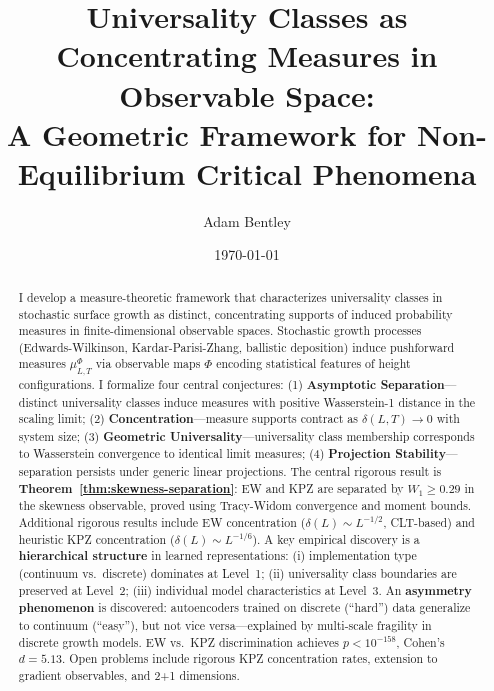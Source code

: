 \documentclass[aps,pre,reprint,amsmath,amssymb,superscriptaddress]{revtex4-2}
\begin{document}

\title{Universality Classes as Concentrating Measures in Observable Space:\\ A Geometric Framework for Non-Equilibrium Critical Phenomena}

\author{Adam Bentley}

\date{\today}

\begin{abstract}
I develop a measure-theoretic framework that characterizes universality classes in stochastic surface growth as distinct, concentrating supports of induced probability measures in finite-dimensional observable spaces. Stochastic growth processes (Edwards-Wilkinson, Kardar-Parisi-Zhang, ballistic deposition) induce pushforward measures $\mu^\Phi_{L,T}$ via observable maps $\Phi$ encoding statistical features of height configurations. I formalize four central conjectures: (1) \textbf{Asymptotic Separation}---distinct universality classes induce measures with positive Wasserstein-1 distance in the scaling limit; (2) \textbf{Concentration}---measure supports contract as $\delta(L,T) \to 0$ with system size; (3) \textbf{Geometric Universality}---universality class membership corresponds to Wasserstein convergence to identical limit measures; (4) \textbf{Projection Stability}---separation persists under generic linear projections. The central rigorous result is \textbf{Theorem~\ref{thm:skewness-separation}}: EW and KPZ are separated by $W_1 \geq 0.29$ in the skewness observable, proved using Tracy-Widom convergence and moment bounds. Additional rigorous results include EW concentration ($\delta(L) \sim L^{-1/2}$, CLT-based) and heuristic KPZ concentration ($\delta(L) \sim L^{-1/6}$). A key empirical discovery is a \textbf{hierarchical structure} in learned representations: (i) implementation type (continuum vs.~discrete) dominates at Level~1; (ii) universality class boundaries are preserved at Level~2; (iii) individual model characteristics at Level~3. An \textbf{asymmetry phenomenon} is discovered: autoencoders trained on discrete (``hard'') data generalize to continuum (``easy''), but not vice versa---explained by multi-scale fragility in discrete growth models. EW vs.~KPZ discrimination achieves $p < 10^{-158}$, Cohen's $d = 5.13$. Open problems include rigorous KPZ concentration rates, extension to gradient observables, and 2+1 dimensions.
\end{abstract}
\end{document}
